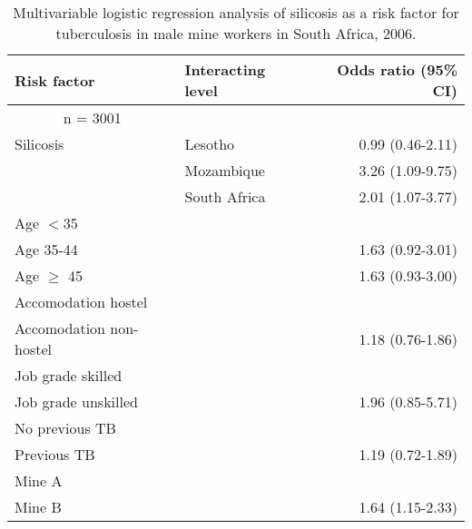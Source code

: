 \documentclass[11pt,a4paper,twoside]{article}\usepackage{graphicx, color}
\begin{document}
\begin{table}[p]
\begin{center}
\begin{tabular}{llr}
  \toprule
Risk factor & Interacting level & Odds ratio (95\% CI) \\ 
  \midrule
  \multicolumn{1}{c}{n = 3001} &  &  \\ 
  Silicosis & Lesotho & 0.99 (0.46-2.11) \\ 
   & Mozambique & 3.26 (1.09-9.75) \\ 
   & South Africa & 2.01 (1.07-3.77) \\ 
  Age $<$35 &  &  \\ 
  Age 35-44 &  & 1.63 (0.92-3.01) \\ 
  Age $\geq$ 45 &  & 1.63 (0.93-3.00) \\ 
  Accomodation hostel &  &  \\ 
  Accomodation non-hostel &  & 1.18 (0.76-1.86) \\ 
  Job grade skilled &  &  \\ 
  Job grade unskilled &  & 1.96 (0.85-5.71) \\ 
  No previous TB &  &  \\ 
  Previous TB &  & 1.19 (0.72-1.89) \\ 
  Mine A &  &  \\ 
  Mine B &  & 1.64 (1.15-2.33) \\ 
   \bottomrule
\end{tabular}
\caption{Multivariable logistic regression analysis of silicosis as a risk factor for tuberculosis in male mine workers in South Africa, 2006.}
\label{reg}
\end{center}
\end{table}
\end{document}
